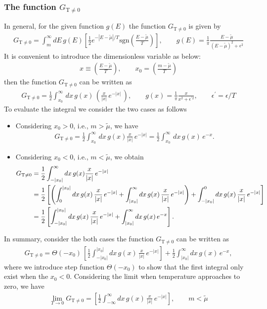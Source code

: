 \documentclass[sn-mathphys,Numbered]{sn-jnl}
\begin{document}
\subsubsection{The function $G_{\mathrm{T\neq0}}$}
In general, for the given function $g(E)$ the function $G_\mathrm{T\neq0}$ is given by
\begin{align}
G_{\mathrm{T\neq0}}=\int^\infty_m\!\!dE\, g(E)\left[\frac{1}{2}e^{ - |E-\widetilde\mu|/T }\mathrm{sgn}\left(\frac{E-\widetilde\mu}{T}\right)\right],\qquad g(E)=\frac{1}{\pi} \frac{E-\tilde\mu}{(E-\tilde\mu)^2+\epsilon^2}
\end{align}
It is convenient to introduce the dimensionless variable as below:
\begin{align}
x\equiv\left(\frac{E-\tilde\mu}{T}\right), \qquad x_0=\left(\frac{m-\tilde\mu}{T}\right)
\end{align}
then the function $G_{\mathrm{T\neq0}}$ can be written as
\begin{align}
G_{\mathrm{T\neq0}}=\frac{1}{2}\int^\infty_{x_0}\,dx\,g(x)\,\left(\frac{x}{|x|}\,e^{-|x|}\,\right),\qquad g(x)=\frac{1}{\pi} \frac{x}{x^2+\epsilon^{\prime2}},\qquad \epsilon^\prime=\epsilon/T
\end{align}
To evaluate the integral we consider the two cases as follows
\begin{itemize}
  \item Considering $x_0>0$, i.e., $m>\tilde\mu$, we have
  \begin{align}
  G_{\mathrm{T\neq0}}=\frac{1}{2}\int^\infty_{x_0}\,dx\,g(x)\frac{x}{|x|}\,e^{-|x|}=\frac{1}{2}\int^{\infty}_{x_0}\,dx\,g(x)\,e^{-x}.
  \end{align}
  \item Considering $x_0<0$, i.e., $m<\tilde\mu$, we obtain
  \begin{align}
    G_{\mathrm{T\neq0}}&=\frac{1}{2}\int^\infty_{-|x_0|}dx\,g(x)\frac{x}{|x|}\,e^{-|x|}\\
    &=\frac{1}{2}\left[\left(\int_0^{|x_0|}dx\,g(x)\,\frac{x}{|x|}\,e^{-|x|}+\int^\infty_{|x_0|}dx\,g(x)\,\frac{x}{|x|}\,e^{-|x|}\right)+\int^0_{-|x_0|}dx\,g(x)\,\frac{x}{|x|}\,e^{-|x|}\right]\notag\\
   &=\frac{1}{2}\left[\int_{-|x_0|}^{|x_0|}dx\,g(x)\,\frac{x}{|x|}\,e^{-|x|}+\int^\infty_{|x_0|}dx\,g(x)\,e^{-x}\right].
  \end{align}
\end{itemize}
In summary, consider the both cases the function $G_\mathrm{T\neq0}$ can be written as
\begin{align}
  G_{\mathrm{T\neq0}}=\Theta(-x_0)\,\left[\frac{1}{2}\int_{-|x_0|}^{|x_0|}dx\,g(x)\,\frac{x}{|x|}\,e^{-|x|}\right]+\frac{1}{2}\int^\infty_{|x_0|}dx\,g(x)\,e^{-x},
\end{align}
where we introduce step function $\Theta(-x_0)$ to show that the first integral only exist when the $x_0<0$.
Considering the limit when temperature approaches to zero, we have
\begin{align}
\lim_{T\to0}G_{\mathrm{T\neq0}}=\left[\frac{1}{2}\int_{-\infty}^{\infty}dx\,g(x)\,\frac{x}{|x|}\,e^{-|x|}\right],\qquad m<\tilde\mu
\end{align}
\end{document}
